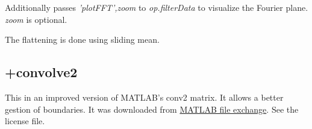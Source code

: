Additionally passes \emph{'plotFFT',zoom} to \emph{op.filterData} to visualize the Fourier plane. \emph{zoom} is optional.
\edf

The flattening is done using sliding mean.

\subsection{+convolve2}
This in an improved version of MATLAB's conv2 matrix. It allows a better gestion of boundaries. 
It was downloaded from \href{http://www.mathworks.com/matlabcentral/fileexchange/22619-fast-2-d-convolution}{MATLAB file exchange}. See the license file.